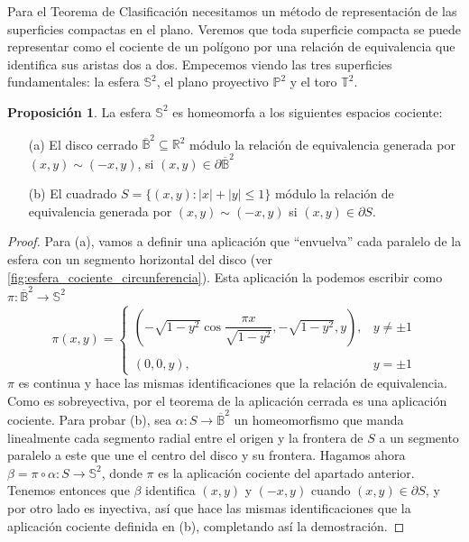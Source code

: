 \documentclass[10pt]{report}
\newcommand{\Esfera}{\mathbb{S}^2}
\newcommand{\Toro}{\mathbb{T}^2}
\newcommand{\Proyectivo}{\mathbb{P}^2}
\theoremstyle{definition}
\newtheorem{prop}[defin]{Proposición}
\begin{document}
Para el Teorema de Clasificación necesitamos un método de representación de las superficies compactas en el plano. Veremos que toda superficie compacta se puede representar como el cociente de un polígono por una relación de equivalencia que identifica sus aristas dos a dos. Empecemos viendo las tres superficies fundamentales: la esfera $\Esfera$, el plano proyectivo $\Proyectivo$ y el toro $\Toro$. 
\begin{prop}%
\label{prop:Esfera como cociente de disco y cuadrado}
La esfera $\mathbb{S}^2$ es homeomorfa a los siguientes espacios cociente: 
\begin{itemize}
\item[(a)] El disco cerrado $\overline{\mathbb{B}}^2\subseteq \mathbb{R}^2$ módulo la relación de equivalencia generada por $(x,y)\sim (-x,y)$, si $(x,y)\in \partial \overline{\mathbb{B}}^2$
\item[(b)] El cuadrado $S=\{(x,y):|x|+|y|\leq 1\}$ módulo la relación de equivalencia generada por $(x,y)\sim(-x,y)$ si $(x,y)\in \partial S$.
\end{itemize}
\end{prop}
\begin{proof}
Para (a), vamos a definir una aplicación que ``envuelva'' cada paralelo de la esfera con un segmento horizontal del disco (ver \autoref{fig:esfera_cociente_circunferencia}).
Esta aplicación la podemos escribir como $\pi:\overline{\mathbb{B}}^2\to \mathbb{S}^2$ 
$$\pi(x,y)=\left\{\begin{array}{lc}
			(-\sqrt{1-y^2} \cos\dfrac{\pi x}{\sqrt{1-y^2}}, -\sqrt{1-y^2}, y), & y\neq \pm 1 \\
			\\(0,0,y), & y=\pm1 

\end{array}
\right.$$
$\pi$ es continua y hace las mismas identificaciones que la relación de equivalencia. Como es sobreyectiva, por el teorema de la aplicación cerrada es una aplicación cociente. %
Para probar (b), sea $\alpha:S\to \overline{\mathbb{B}}^2$ un homeomorfismo que manda linealmente cada segmento radial entre el origen y la frontera de $S$ a un segmento paralelo a este que une el centro del disco y su frontera. Hagamos ahora $\beta=\pi \circ \alpha : S \to \mathbb{S}^2$, donde $\pi$ es la aplicación cociente del apartado anterior. Tenemos entonces que $\beta$ identifica $(x,y)$ y $(-x,y)$ cuando $(x,y)\in \partial S$, y por otro lado es inyectiva, así que hace las mismas identificaciones que la aplicación cociente definida en (b), completando así la demostración.%
\end{proof}
\end{document}
